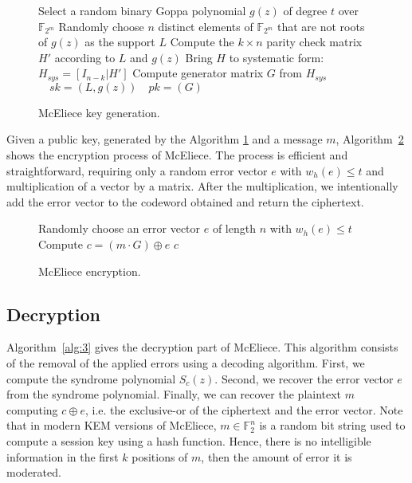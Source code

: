 \begin{figure}[ht]
\centering
\begin{algorithm}[H]
 Select a random binary Goppa polynomial $g(z)$ of degree $t$ over $\mathbb{F}_{2^{m}}$\;
 Randomly choose $n$ distinct elements of $\mathbb{F}_{2^m}$ that are not roots of $g(z)$ as the support $L$\;
 Compute the $k \times n$ parity check matrix $H'$ according to $L$ and $g(z)$\;
 Bring $H$ to systematic form: $H_{sys} = [I_{n-k}|H']$\;
 Compute generator matrix $G$ from $H_{sys}$\;
 \Return $\quad sk = (L, g(z)) \quad pk = (G)$\;
 \caption{McEliece key generation.}
 \label{alg:keygen}
\end{algorithm}
\end{figure}

Given a public key, generated by the Algorithm \ref{alg:keygen} and a message $m$, Algorithm~\ref{alg:2} shows the encryption process of McEliece. The process is efficient and straightforward, requiring only a random error vector $e$ with $w_h(e) \leq t$ and multiplication of a vector by a matrix. After the multiplication, we intentionally add the error vector to the codeword obtained and return the ciphertext.

\begin{figure}[ht]
\centering
\begin{algorithm}[H]
Randomly choose  an error vector $e$ of length $n$ with $w_h(e)\leq t$\;
Compute $c = (m\cdot G) \oplus e$\;
\Return $c$\;
\caption{McEliece encryption.}\label{alg:2}
\end{algorithm}
\end{figure}

\subsection{Decryption}
\label{sub:mc-dec}
Algorithm~\ref{alg:3} gives the decryption part of McEliece. This algorithm consists of the removal of the applied errors using a decoding algorithm. First, we compute the syndrome polynomial $S_c(z)$. Second, we recover the error vector $e$ from the syndrome polynomial. Finally, we can recover the plaintext $m$ computing $c \oplus e$, i.e. the exclusive-or of the ciphertext and the error vector. Note that in modern KEM versions of McEliece, $m\in \mathbb{F}^n_{2}$ is a random bit string used to compute a session key using a hash function. Hence, there is no intelligible information in the first $k$ positions of $m$, then the amount of error it is moderated.

